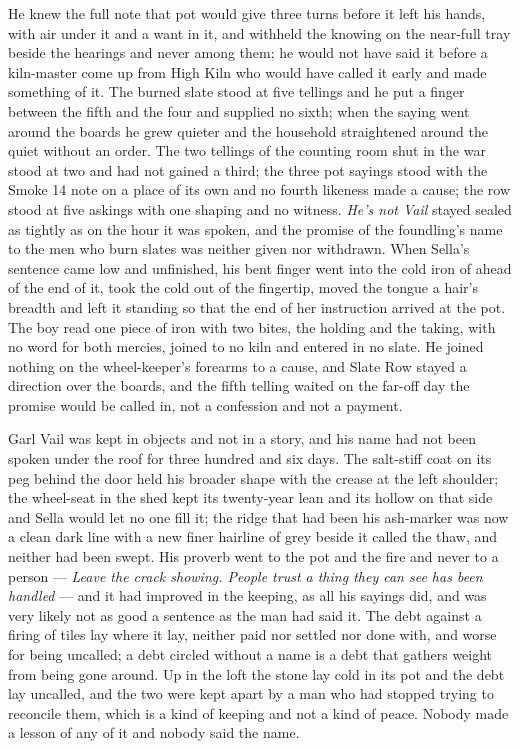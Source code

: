He knew the full note that pot would give three turns before it left his hands, with air under it and a want in it, and withheld the knowing on the near-full tray beside the hearings and never among them; he would not have said it before a kiln-master come up from High Kiln who would have called it early and made something of it. The burned slate stood at five tellings and he put a finger between the fifth and the four and supplied no sixth; when the saying went around the boards he grew quieter and the household straightened around the quiet without an order. The two tellings of the counting room shut in the war stood at two and had not gained a third; the three pot sayings stood with the Smoke 14 note on a place of its own and no fourth likeness made a cause; the row stood at five askings with one shaping and no witness. \emph{He's not Vail} stayed sealed as tightly as on the hour it was spoken, and the promise of the foundling's name to the men who burn slates was neither given nor withdrawn. When Sella's sentence came low and unfinished, his bent finger went into the cold iron of  ahead of the end of it, took the cold out of the fingertip, moved the tongue a hair's breadth and left it standing so that the end of her instruction arrived at the pot. The boy read one piece of iron with two bites, the holding and the taking, with no  word for both mercies, joined to no kiln and entered in no slate. He joined nothing on the wheel-keeper's forearms to a cause, and Slate Row stayed a direction over the boards, and the fifth telling waited on the far-off day the promise would be called in, not a confession and not a payment.

Garl Vail was kept in objects and not in a story, and his name had not been spoken under the roof for three hundred and six days. The salt-stiff coat on its peg behind the door held his broader shape with the crease at the left shoulder; the wheel-seat in the shed kept its twenty-year lean and its hollow on that side and Sella would let no one fill it; the ridge that had been his ash-marker was now a clean dark line with a new finer hairline of grey beside it called the thaw, and neither had been swept. His proverb went to the pot and the fire and never to a person --- \emph{Leave the crack showing. People trust a thing they can see has been handled} --- and it had improved in the keeping, as all his sayings did, and was very likely not as good a sentence as the man had said it. The debt against a firing of tiles lay where it lay, neither paid nor settled nor done with, and worse for being uncalled; a debt circled without a name is a debt that gathers weight from being gone around. Up in the loft the stone lay cold in its pot and the debt lay uncalled, and the two were kept apart by a man who had stopped trying to reconcile them, which is a kind of keeping and not a kind of peace. Nobody made a lesson of any of it and nobody said the name.

